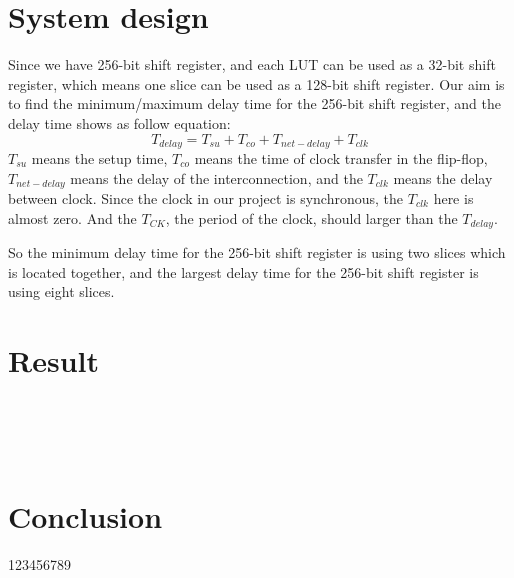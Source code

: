 \documentclass[12pt]{article}
\begin{document}
\section{System design}  \label{a3}
Since we have 256-bit shift register, and each LUT can be used as a 32-bit shift register, which means one slice can be used as a 128-bit shift register. Our aim is to find the minimum/maximum delay time for the 256-bit shift register, and the delay time shows as follow equation:
$$T_{delay}=T_{su}+T_{co}+T_{net-delay}+T_{clk}$$
$T_{su}$ means the setup time, $T_{co}$ means the time of clock transfer in the flip-flop, $T_{net-delay}$ means the delay of the interconnection, and the $T_{clk}$ means the delay between clock. Since the clock in our project is synchronous, the $T_{clk}$ here is almost zero. And the $T_{CK}$, the period of the clock, should larger than the $T_{delay}$.

So the minimum delay time for the 256-bit shift register is using two slices which is located together, and the largest delay time for the 256-bit shift register is using eight slices.
 

\section{Result}  \label{a4}

\lipsum[1]\\
\lipsum[1]\\
\lipsum[1]\\

\section{Conclusion}  \label{a5}
123456789
\newpage


\end{document}
